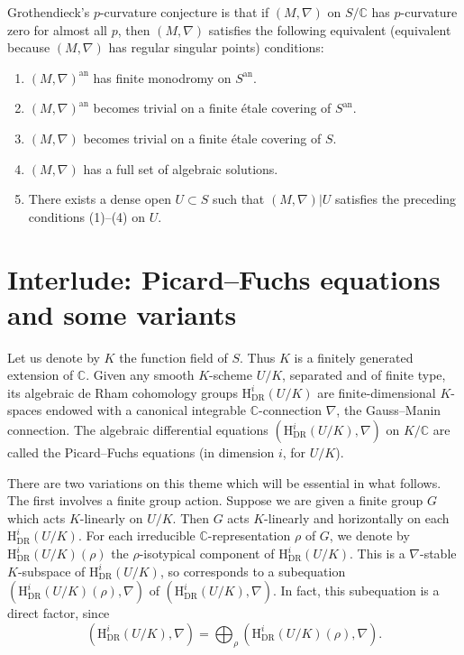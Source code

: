 Grothendieck's \(p\)-curvature conjecture is that if \((M,\nabla)\) on \(S/\mathbb{C}\) has \(p\)-curvature zero for almost all \(p\), then \((M,\nabla)\) satisfies the following equivalent (equivalent because \((M,\nabla)\) has regular singular points) conditions:
\begin{enumerate}[label=(\arabic*)]
\item \((M,\nabla)^{\mathrm{an}}\) has finite monodromy on \(S^{\mathrm{an}}\).
\item \((M,\nabla)^{\mathrm{an}}\) becomes trivial on a finite étale covering of \(S^{\mathrm{an}}\).
\item \((M,\nabla)\) becomes trivial on a finite étale covering of \(S\).
\item \((M,\nabla)\) has a full set of algebraic solutions.
\item There exists a dense open \(U\subset S\) such that \((M,\nabla)|U\) satisfies the preceding conditions (1)--(4) on \(U\).
\end{enumerate}

\section{Interlude: Picard--Fuchs equations and some variants}
\label{sec:9.2}

Let us denote by \(K\) the function field of \(S\). Thus \(K\) is a finitely generated extension of \(\mathbb{C}\). Given any smooth \(K\)-scheme \(U/K\), separated and of finite type, its algebraic de Rham cohomology groups \(\mathrm{H}^i_{\mathrm{DR}}(U/K)\) are finite-dimensional \(K\)-spaces endowed with a canonical integrable \(\mathbb{C}\)-connection \(\nabla\), the Gauss--Manin connection. The algebraic differential equations \((\mathrm{H}^i_{\mathrm{DR}}(U/K),\nabla)\) on \(K/\mathbb{C}\) are called the Picard--Fuchs equations (in dimension \(i\), for \(U/K\)).

There are two variations on this theme which will be essential in what follows. The first involves a finite group action. Suppose we are given a finite group \(G\) which acts \(K\)-linearly on \(U/K\). Then \(G\) acts \(K\)-linearly and horizontally on each \(\mathrm{H}^i_{\mathrm{DR}}(U/K)\). For each irreducible \(\mathbb{C}\)-representation \(\rho\) of \(G\), we denote by \(\mathrm{H}^i_{\mathrm{DR}}(U/K)(\rho)\) the \(\rho\)-isotypical component of \(\mathrm{H}^i_{\mathrm{DR}}(U/K)\). This is a \(\nabla\)-stable \(K\)-subspace of \(\mathrm{H}^i_{\mathrm{DR}}(U/K)\), so corresponds to a subequation \((\mathrm{H}^i_{\mathrm{DR}}(U/K)(\rho),\nabla)\) of \((\mathrm{H}^i_{\mathrm{DR}}(U/K),\nabla)\). In fact, this subequation is a direct factor, since
\[
(\mathrm{H}^i_{\mathrm{DR}}(U/K),\nabla)=\bigoplus_\rho(\mathrm{H}^i_{\mathrm{DR}}(U/K)(\rho),\nabla).
\]


